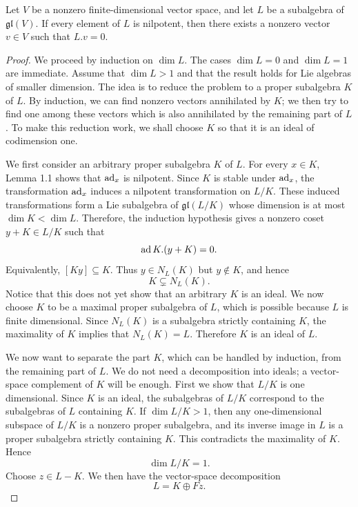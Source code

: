\begin{theorem}
    Let $V$ be a nonzero finite-dimensional vector space, and let $L$ be a subalgebra of $\mathfrak{gl}(V)$. If every element of $L$ is nilpotent, then there exists a nonzero vector $v\in V$ such that $L.v=0$.
\end{theorem}
\begin{proof}
    We proceed by induction on $\operatorname{dim}L$. The cases $\operatorname{dim}L=0$ and $\operatorname{dim}L=1$ are immediate. Assume that $\operatorname{dim}L>1$ and that the result holds for Lie algebras of smaller dimension. The idea is to reduce the problem to a proper subalgebra $K$ of $L$. By induction, we can find nonzero vectors annihilated by $K$; we then try to find one among these vectors which is also annihilated by the remaining part of $L$. To make this reduction work, we shall choose $K$ so that it is an ideal of codimension one.

    We first consider an arbitrary proper subalgebra $K$ of $L$. For every $x\in K$, Lemma 1.1 shows that $\operatorname{ad}_x$ is nilpotent. Since $K$ is stable under $\operatorname{ad}_x$, the transformation $\operatorname{ad}_x$ induces a nilpotent transformation on $L/K$. These induced transformations form a Lie subalgebra of $\mathfrak{gl}(L/K)$ whose dimension is at most $\operatorname{dim}K<\operatorname{dim}L$. Therefore, the induction hypothesis gives a nonzero coset $y+K\in L/K$ such that
    \[
        \operatorname{ad} K.(y+K)=0.
    \]
    Equivalently, $[Ky]\subseteq K$. Thus $y\in N_L(K)$ but $y\notin K$, and hence
    \[
        K\subsetneq N_L(K).
    \]
    Notice that this does not yet show that an arbitrary $K$ is an ideal. We now choose $K$ to be a maximal proper subalgebra of $L$, which is possible because $L$ is finite dimensional. Since $N_L(K)$ is a subalgebra strictly containing $K$, the maximality of $K$ implies that $N_L(K)=L$. Therefore $K$ is an ideal of $L$.

    We now want to separate the part $K$, which can be handled by induction, from the remaining part of $L$. We do not need a decomposition into ideals; a vector-space complement of $K$ will be enough. First we show that $L/K$ is one dimensional. Since $K$ is an ideal, the subalgebras of $L/K$ correspond to the subalgebras of $L$ containing $K$. If $\operatorname{dim}L/K>1$, then any one-dimensional subspace of $L/K$ is a nonzero proper subalgebra, and its inverse image in $L$ is a proper subalgebra strictly containing $K$. This contradicts the maximality of $K$. Hence
    \[
        \operatorname{dim}L/K=1.
    \]
    Choose $z\in L-K$. We then have the vector-space decomposition
    \[
        L=K\oplus Fz.
    \]


\end{proof}
